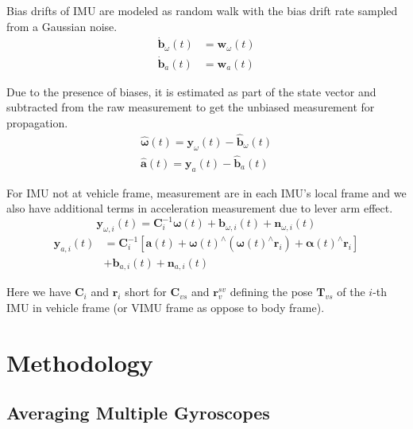 \documentclass[conference]{IEEEtran}
\begin{document}
Bias drifts of IMU are modeled as random walk with the bias drift rate sampled from a Gaussian noise.
\begin{equation}
\begin{split}
    \dot{\textbf{b}}_\omega(t) &= \textbf{w}_\omega(t) \\
    \dot{\textbf{b}}_a(t) &= \textbf{w}_a(t)
\end{split}
\end{equation}

Due to the presence of biases, it is estimated as part of the state vector and subtracted from the raw measurement to get the unbiased measurement for propagation.
\begin{equation}
\begin{split}
    \hat{\bm{\omega}}(t) = \textbf{y}_\omega(t) - \hat{\textbf{b}}_\omega(t) \\
    \hat{\textbf{a}}(t)  = \textbf{y}_a(t) - \hat{\textbf{b}}_a(t)
\end{split}
\end{equation}

For IMU not at vehicle frame, measurement are in each IMU's local frame and we also have additional terms in acceleration measurement due to lever arm effect.
\begin{equation}
    \textbf{y}_{\omega,i}(t) = \textbf{C}_{i}^{-1} \bm{\omega}(t) + \textbf{b}_{\omega, i}(t) + \textbf{n}_{\omega,i}(t)
\end{equation}
\begin{equation}
\begin{split}
    \textbf{y}_{a,i}(t) &= \textbf{C}_i^{-1} \left[ \textbf{a}(t) + \bm{\omega}(t)^\wedge (\bm{\omega}(t)^\wedge \textbf{r}_i) + \bm{\alpha}(t)^\wedge \textbf{r}_i \right] \\
    &+ \textbf{b}_{a,i}(t) + \textbf{n}_{a,i}(t)
\end{split}
\end{equation}

Here we have $\textbf{C}_i$ and $\textbf{r}_i$ short for $\textbf{C}_{vs}$ and $\textbf{r}_v^{sv}$ defining the pose $\textbf{T}_{vs}$ of the $i$-th IMU in vehicle frame (or VIMU frame as oppose to body frame).

\section{Methodology}\label{methodology}

\subsection{Averaging Multiple Gyroscopes}
\end{document}
